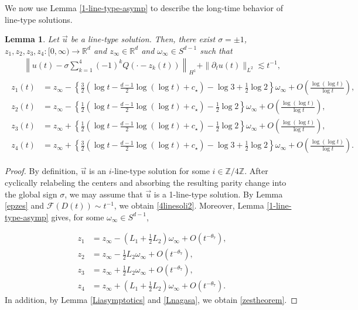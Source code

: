 \documentclass[reqno]{amsart}
\theoremstyle{plain}
\newtheorem{lemma}[theorem]{Lemma}
\theoremstyle{definition}
\numberwithin{equation}{section}
\begin{document}
We now use Lemma \ref{1-line-type-asymp} to describe the long-time behavior of line-type solutions.
\begin{lemma}\label{1-linekansei}
Let $\vec{u}$ be a line-type solution. Then, there exist $\sigma=\pm 1$, $z_1,z_2,z_3,z_4:[0,\infty)\to\mathbb{R}^d$ and $z_{\infty}\in\mathbb{R}^d$ and $\omega_{\infty}\in S^{d-1}$ such that 
\begin{align}\label{4linesoli2}
\left\| u(t)-\sigma \sum_{k=1}^4 (-1)^kQ(\cdot-z_k(t))\right\|_{H^1}+\|{\partial}_tu(t)\|_{L^2}\lesssim t^{-1},
\end{align}
\begin{align}\label{zestheorem}
\begin{aligned}
z_1(t)&=z_{\infty}-\left\{\frac{3}{2}\left(\log{t}-\frac{d-1}{2}\log{(\log{t})}+c_{\star}\right)-\log{3}+\frac{1}{2}\log{2} \right\}\omega_{\infty}+O\left(\frac{\log{(\log{t})}}{\log{t}}\right),
\\
z_2(t)&=z_{\infty}-\left\{\frac{1}{2}\left(\log{t}-\frac{d-1}{2}\log{(\log{t})}+c_{\star}\right)-\frac{1}{2}\log{2} \right\}\omega_{\infty}+O\left(\frac{\log{(\log{t})}}{\log{t}}\right),
\\
z_3(t)&=z_{\infty}+\left\{\frac{1}{2}\left(\log{t}-\frac{d-1}{2}\log{(\log{t})}+c_{\star}\right)-\frac{1}{2}\log{2} \right\}\omega_{\infty}+O\left(\frac{\log{(\log{t})}}{\log{t}}\right),
\\
z_4(t)&=z_{\infty}+\left\{\frac{3}{2}\left(\log{t}-\frac{d-1}{2}\log{(\log{t})}+c_{\star}\right)-\log{3}+\frac{1}{2}\log{2} \right\}\omega_{\infty}+O\left(\frac{\log{(\log{t})}}{\log{t}}\right).
\end{aligned}
\end{align}
\end{lemma}

\begin{proof}
By definition, $\vec{u}$ is an $i$-line-type solution for some $i\in\mathbb{Z}/4\mathbb{Z}$. After cyclically relabeling the centers and absorbing the resulting parity change into the global sign $\sigma$, we may assume that $\vec{u}$ is a 1-line-type solution. By Lemma \ref{epzes} and $\mathcal{F}(D(t))\sim t^{-1}$, we obtain \eqref{4linesoli2}. Moreover, Lemma \ref{1-line-type-asymp} gives, for some $\omega_\infty\in S^{d-1}$,

\begin{align*}
z_1&=z_\infty-\left(L_1+\frac{1}{2}L_2\right)\omega_\infty+O(t^{-\theta_7}),
\\
z_2&=z_\infty-\frac{1}{2}L_2\omega_\infty+O(t^{-\theta_7}),
\\
z_3&=z_\infty+\frac{1}{2}L_2\omega_\infty+O(t^{-\theta_7}),
\\
z_4&=z_\infty+\left(L_1+\frac{1}{2}L_2\right)\omega_\infty+O(t^{-\theta_7}).
\end{align*}
In addition, by Lemma \ref{Liasymptotics} and \eqref{Lnagasa}, we obtain \eqref{zestheorem}.

\end{proof}
\end{document}
